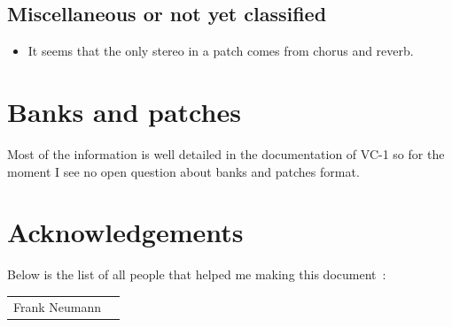 \documentclass[11pt]{report}
\begin{document}
\section{Miscellaneous or not yet classified}
\begin{itemize}
  \item It seems that the only stereo in a patch comes from chorus and reverb.
\end{itemize}
  

\chapter{Banks and patches}

Most of the information is well detailed in the documentation of VC-1 so
for the moment I see no open question about banks and patches format.

\chapter{Acknowledgements}
Below is the list of all people that helped me making this document~:\\

\begin{tabular}{ll}
Frank Neumann
&
\end{tabular}
\end{document}
